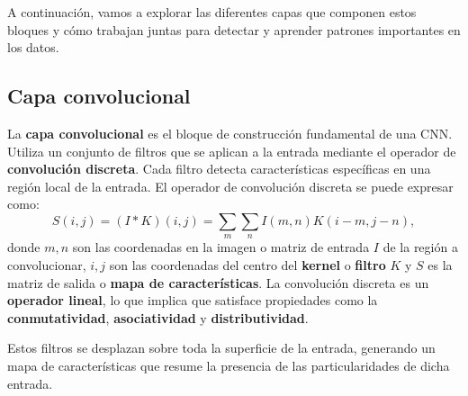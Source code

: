 A continuación, vamos a explorar las diferentes capas que componen estos bloques y cómo trabajan juntas para detectar y aprender patrones importantes en los datos.

\subsection{Capa convolucional}

La \textbf{capa convolucional} es el bloque de construcción fundamental de una CNN. Utiliza un conjunto de filtros que se aplican a la entrada mediante el operador de \textbf{convolución discreta}. Cada filtro detecta características específicas en una región local de la entrada. El operador de convolución discreta se puede expresar como:
\begin{equation}
	S(i, j) = (I \ast K)(i, j) = \sum_m \sum_n I(m, n) K(i-m, j-n),
\end{equation}
donde $m,n$ son las coordenadas en la imagen o matriz de entrada \(I\) de la región a convolucionar, $i,j$ son las coordenadas del centro del \textbf{kernel} o \textbf{filtro} \(K\) y \(S\) es la matriz de salida o \textbf{mapa de características}. La convolución discreta es un \textbf{operador lineal}, lo que implica que satisface propiedades como la \textbf{conmutatividad}, \textbf{asociatividad} y \textbf{distributividad}.

Estos filtros se desplazan sobre toda la superficie de la entrada, generando un mapa de características que resume la presencia de las particularidades de dicha entrada.

